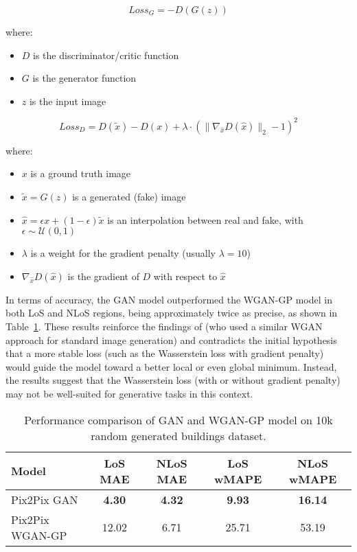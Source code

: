 		\begin{equation}
			Loss_G = -D( G(z) )
		\end{equation}
		
		\noindent where:
		\begin{itemize}[itemsep=1mm, parsep=0pt]
			\item $D$ is the discriminator/critic function
			\item $G$ is the generator function
			\item $z$ is the input image
		\end{itemize}
		
		\begin{equation}
			Loss_D = D(\tilde{x}) - D(x) + \lambda \cdot \left( \| \nabla_{\hat{x}} D(\hat{x}) \|_2 - 1 \right)^2
		\end{equation}
		
		\noindent where:
		\begin{itemize}[itemsep=1mm, parsep=0pt]
			\item $x$ is a ground truth image
			\item $\tilde{x} = G(z)$ is a generated (fake) image
			\item $\hat{x} = \epsilon x + (1 - \epsilon) \tilde{x}$ is an interpolation between real and fake, with $\epsilon \sim \mathcal{U}(0,1)$
			\item $\lambda$ is a weight for the gradient penalty (usually $\lambda = 10$)
			\item $\nabla_{\hat{x}} D(\hat{x})$ is the gradient of $D$ with respect to $\hat{x}$
		\end{itemize}
		
		In terms of accuracy, the GAN model outperformed the WGAN-GP model in both LoS and NLoS regions, being approximately twice as precise, as shown in Table~\ref{tab:performance_wgangp}. These results reinforce the findings of \citeauthor{noah_makow_wasserstein_2018} (who used a similar WGAN approach for standard image generation) and contradicts the initial hypothesis that a more stable loss (such as the Wasserstein loss with gradient penalty) would guide the model toward a better local or even global minimum. Instead, the results suggest that the Wasserstein loss (with or without gradient penalty) may not be well-suited for generative tasks in this context.
		
		\begin{table}[h!]
			\centering
			\begin{tabular}{|l|c|c|c|c|}
				\hline
				\textbf{Model} & \textbf{LoS MAE} & \textbf{NLoS MAE} & \textbf{LoS wMAPE} & \textbf{NLoS wMAPE} \\
				\hline
				Pix2Pix GAN & \textbf{4.30} & \textbf{4.32} & \textbf{9.93} & \textbf{16.14} \\
				Pix2Pix WGAN-GP & 12.02 & 6.71 & 25.71 & 53.19 \\
				\hline
			\end{tabular}
			\caption{Performance comparison of GAN and WGAN-GP model on 10k random generated buildings dataset.}
			\label{tab:performance_wgangp}
		\end{table}
		
